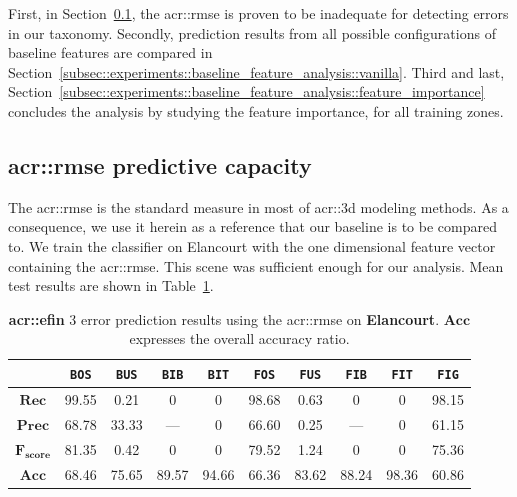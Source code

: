     First, in Section~\ref{subsec::experiments::baseline_feature_analysis::rmse}, the \gls{acr::rmse} is proven to be inadequate for detecting errors in our taxonomy.
    Secondly, prediction results from all possible configurations of baseline features are compared in Section~\ref{subsec::experiments::baseline_feature_analysis::vanilla}.
    Third and last, Section~\ref{subsec::experiments::baseline_feature_analysis::feature_importance} concludes the analysis by studying the feature importance, for all training zones.

    \subsection{\texorpdfstring{\acrlong*{acr::rmse}}{RMSE} predictive capacity}
        \label{subsec::experiments::baseline_feature_analysis::rmse}
        The \acrfull{acr::rmse} is the standard measure in most of \gls{acr::3d} modeling methods.
        As a consequence, we use it herein as a reference that our baseline is to be compared to.
        We train the classifier on Elancourt with the one dimensional feature vector containing the \gls{acr::rmse}.
        This scene was sufficient enough for our analysis.
        Mean test results are shown in Table~\ref{tab::rmse_results}.\\

        \begin{table}[htb]
            \footnotesize
            \begin{tabular}{c c c c c c c c c c}
                \toprule
                & \texttt{BOS} & \texttt{BUS} & \texttt{BIB} & \texttt{BIT} & \texttt{FOS} & \texttt{FUS} & \texttt{FIB} & \texttt{FIT} & \texttt{FIG} \\
                \midrule
                \(\bm{Rec}\) & 99.55 & 0.21 & 0 & 0 & 98.68 & 0.63 & 0 & 0 & 98.15 \\
                \midrule
                \(\bm{Prec}\) & 68.78 & 33.33 & --- & 0 & 66.60 & 0.25 & --- & 0 & 61.15 \\
                \midrule
                \(\bm{F_{score}}\) & 81.35 & 0.42 & 0 & 0 & 79.52 & 1.24 & 0 & 0 & 75.36 \\
                \midrule
                \(\bm{Acc}\) & 68.46 & 75.65 & 89.57 & 94.66 & 66.36 & 83.62 & 88.24 & 98.36 & 60.86 \\
                \bottomrule
            \end{tabular}
            \caption[
                \textbf{\gls{acr::efin}} 3 error prediction results using the \gls{acr::rmse} on \textbf{Elancourt}.
            ]{
                \label{tab::rmse_results}
                \textbf{\gls{acr::efin}} 3 error prediction results using the \gls{acr::rmse} on \textbf{Elancourt}.
                \(\bm{Acc}\) expresses the overall accuracy ratio.
            }
        \end{table}

